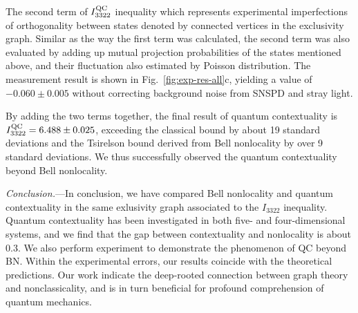 \documentclass[prl,letterpaper,english,reprint,nofootinbib,aps,superscriptaddress,showpacs,showkeys]{revtex4-1}
\theoremstyle{definition}
\theoremstyle{remark}
\begin{document}
 The second term of $I_{3322}^{\rm QC}$ inequality which represents experimental imperfections of orthogonality between states denoted by connected vertices in the exclusivity graph.
 Similar as the way the first term was calculated, the second term was also evaluated by adding up mutual projection probabilities of the states mentioned above, and their fluctuation also estimated by Poisson distribution. The measurement result is shown in Fig.~\ref{fig:exp-res-all}c, yielding a value of $-0.060 \pm 0.005$ without correcting background noise from SNSPD and stray light.

 By adding the two terms together, the final result of quantum contextuality is $I_{3322}^{\rm QC}=6.488 \pm 0.025$, exceeding the classical bound by about 19 standard deviations and the Tsirelson bound derived from Bell nonlocality by over 9 standard deviations. We thus successfully observed the quantum contextuality beyond Bell nonlocality.

 \emph{Conclusion.}---In conclusion, we have compared Bell nonlocality and quantum contextuality in the same exlusivity graph associated to the $I_{3322}$ inequality. Quantum contextuality has been investigated in both five- and four-dimensional systems, and we find that the gap between contextuality and nonlocality is about $0.3$. We also perform experiment to demonstrate the phenomenon of QC beyond BN. Within the experimental errors, our results coincide with the theoretical predictions.
 Our work indicate the deep-rooted connection between graph theory and nonclassicality, and is in turn beneficial for profound comprehension of quantum mechanics.
\end{document}
